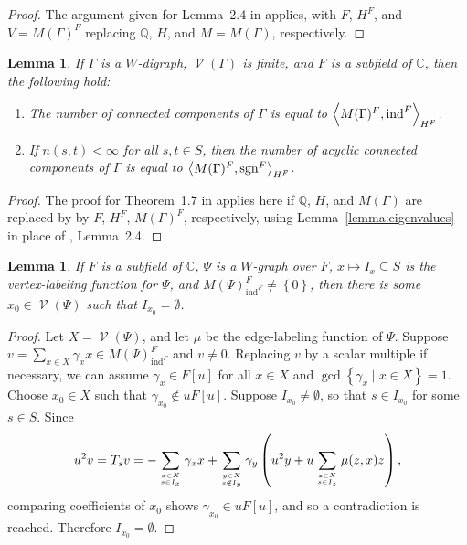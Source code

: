 \documentclass[11pt,leqno]{article}
\theoremstyle{plain}
\newtheorem{lemma}[theorem]{Lemma}
\theoremstyle{definition}
\numberwithin{subcase}{case}
\numberwithin{subsubcase}{subcase}
\numberwithin{table}{section}
\numberwithin{equation}{section}
\newcommand{\infinity}{\infty}
\newcommand{\set}[1]{\left\{#1\right\}}
\newcommand{\setof}[2]{\left\{{#1}\mid{#2}\right\}}
\newcommand{\rationals}{\mathbb Q}%
\newcommand{\complexes}{\mathbb C}
\newcommand{\charprod}[3]{\left<{#1},\strut{#2}\right>_{#3}}
\DeclareMathOperator{\ind}{ind}
\DeclareMathOperator{\sgn}{sgn}
\DeclareMathOperator{\vertices}{{\mathscr V}}
\begin{document}
\begin{proof}
The argument given for 
Lemma~2.4 in \cite{digraphpaper} applies, 
with $F$, $H^F$, and $V=M(\Gamma)^F$ replacing
$\rationals$, $H$, and $M=M(\Gamma)$, respectively.
\end{proof}



\begin{lemma}
\label{lemma:linearcharmults}
If $\Gamma$ is a $W$-digraph, $\vertices(\Gamma)$ is finite, 
and $F$ is a subfield of $\complexes$, 
then the following hold:
\begin{enumerate}[{\upshape(i)}]
\item
The number of connected components of $\Gamma$ is equal to 
$\charprod{M(\Gamma)^F}{\ind^F}{H^F}$.
\item
If $n(s,t) < \infinity$ for all $s, t \in S$, then
the number of acyclic connected components of $\Gamma$ is equal
to $\charprod{M(\Gamma)^F}{\sgn^F}{H^F}$.
\end{enumerate}
\end{lemma}

\begin{proof}
The proof for  Theorem~1.7 in \cite{digraphpaper} 
 applies here if
$\rationals$, $H$, and $M(\Gamma)$ are replaced by
by $F$, $H^F$, $M(\Gamma)^F$, respectively, using 
Lemma~\ref{lemma:eigenvalues} in place of  
\cite{digraphpaper}, Lemma~2.4.
\end{proof}


\begin{lemma}
If $F$ is a subfield of $\complexes$, $\Psi$ is a $W$-graph over $F$,  
$x \mapsto I_x \subseteq S$ is the vertex-labeling function for $\Psi$, 
 and $M(\Psi)^F_{\ind^F} \ne \set{0}$, 
then there is some $x_0 \in \vertices(\Psi)$ such that $I_{x_0}= \emptyset$.
\label{lemma:indlemma}
\end{lemma}

\begin{proof}
Let $X = \vertices(\Psi)$, and let 
$\mu$ be the edge-labeling function of $\Psi$. 
Suppose
$v = \sum_{x \in X} \gamma_x x \in M(\Psi)^F_{\ind^F}$ and $v \ne 0$.
Replacing $v$ by a scalar multiple if necessary, we can assume 
$\gamma_x \in F[u]$ for all $x\in X$ and
$\gcd \setof{\gamma_x}{x \in X} = 1$.
Choose $x_0 \in X$ such that $\gamma_{x_0} \not\in u F[u]$.
Suppose $I_{x_0} \ne \emptyset$, so that
 $s \in I_{x_0}$ for some $s \in S$.  Since 
\[
u^2 v = T_s v
 = 
- \sum_{  \genfrac {} {} {0pt} {3} {x \in X} {s \in I_x} } \gamma_x x
+
\sum_{  \genfrac {} {} {0pt} {3} {y \in X} {s \not\in I_y} }
 \gamma_y \left( u^2 y + u \sum_{\genfrac {} {} {0pt} {3} {z \in X} {s \in I_z}} \mu(z,x) z \right),
\]
comparing coefficients of $x_0$ shows $\gamma_{x_0} \in u F[u]$, and
so a contradiction is reached.  
Therefore $I_{x_0}= \emptyset$.
\end{proof}
\end{document}
